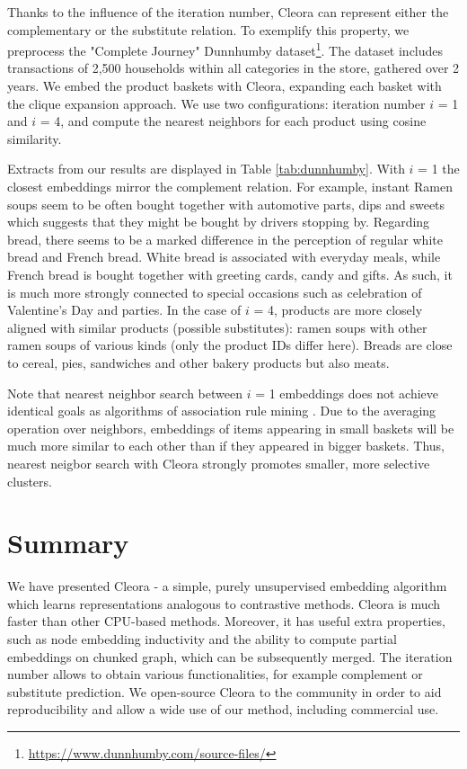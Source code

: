 \documentclass{IEEEtran}
\begin{document}
Thanks to the influence of the iteration number, Cleora can represent either the complementary or the substitute relation. To exemplify this property, we preprocess the "Complete Journey" Dunnhumby dataset\footnote{\url{https://www.dunnhumby.com/source-files/}}. The dataset includes transactions of 2,500 households within all categories in the store, gathered over 2 years. We embed the product baskets with Cleora, expanding each basket with the clique expansion approach. We use two configurations: iteration number $i$ = 1 and $i$ = 4, and compute the nearest neighbors for each product using cosine similarity.

Extracts from our results are displayed in Table \ref{tab:dunnhumby}. With $i$ = 1 the closest embeddings mirror the complement relation. For example, instant Ramen soups seem to be often bought together with automotive parts, dips and sweets which suggests that they might be bought by drivers stopping by. Regarding bread, there seems to be a marked difference in the perception of regular white bread and French bread. White bread is associated with everyday meals, while French bread is bought together with greeting cards, candy and gifts. As such, it is much more strongly connected to special occasions such as celebration of Valentine's Day and parties. In the case of $i$ = 4, products are more closely aligned with similar products (possible substitutes): ramen soups with other ramen soups of various kinds (only the product IDs differ here). Breads are close to cereal, pies, sandwiches and other bakery products but also meats.

Note that nearest neighbor search between $i$ = 1 embeddings does not achieve identical goals as algorithms of association rule mining \cite{agrawal1993mining, agarwal1994fast, grahne2003efficiently}. Due to the averaging operation over neighbors, embeddings of items appearing in small baskets will be much more similar to each other than if they appeared in bigger baskets. Thus, nearest neigbor search with Cleora strongly promotes smaller, more selective clusters.


\section{Summary}

We have presented Cleora - a simple, purely unsupervised embedding algorithm which learns representations analogous to contrastive methods. Cleora is much faster than other CPU-based methods. Moreover, it has useful extra properties, such as node embedding inductivity and the ability to compute partial embeddings on chunked graph, which can be subsequently merged. The iteration number allows to obtain various functionalities, for example complement or substitute prediction. We open-source Cleora to the community in order to aid reproducibility and allow a wide use of our method, including commercial use.
\end{document}

